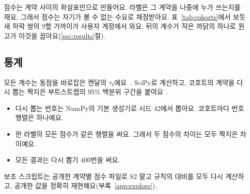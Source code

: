 \begin{puri}
점수는 계약 사이의 화살표만으로 만들어요. 라벨은 그 계약을 나중에 누가 쓰는지를 재요. 그래서 점수는 자기가 볼 수 없는 수요로 채점받아요. 표~\ref{tab:cohorts}에서 보듯 새 허락 쌍의 9할 가까이가 사용자 계정에서 와요. 뒤의 계수가 작은 까닭의 하나로 원고가 이것을 꼽아요(\ref{sec:results}절).
\end{puri}

\subsection{통계}

모든 계수는 동점을 바로잡은 켄달의 $\tau_b$예요~\cite{kendall1945ties}. SciPy로 계산하고, 코호트의 계약을 다시 뽑는 짝지은 부트스트랩의 95\% 백분위 구간을 붙여요~\cite{efron1979bootstrap,diciccio1996bootstrap}.
\begin{itemize}
\item 다시 뽑는 번호는 NumPy의 기본 생성기로 시드 42에서 뽑아요. 코호트마다 번호 행렬은 하나예요.
\item 한 라벨의 모든 점수가 같은 행렬을 써요. 그래서 두 점수의 차이는 모두 짝지은 차이예요.
\item 모든 결과는 다시 뽑기 400번을 써요.
\end{itemize}
보조 스크립트는 공개한 계약별 점수 파일로 S2 말고 규칙의 대비를 모두 다시 계산하고, 공개한 값을 정확히 재현해요(부록~\ref{app:explore}).
